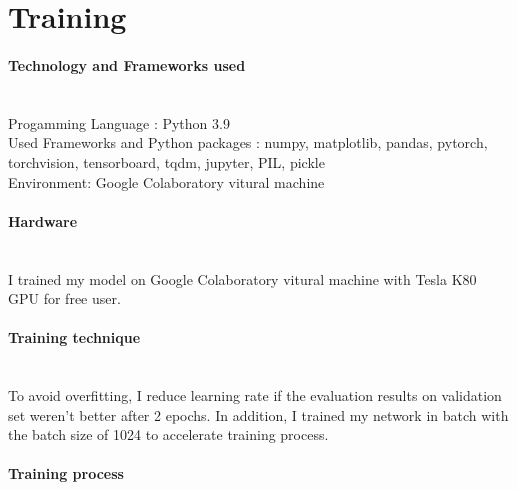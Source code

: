 \documentclass[runningheads]{llncs}
\begin{document}
\section{Training}
\paragraph{\large\bf Technology and Frameworks used}\hspace*{\fill} \\
Progamming Language : Python 3.9\\
Used Frameworks and Python packages : numpy, matplotlib, pandas, pytorch, torchvision, tensorboard, tqdm, jupyter, PIL, pickle\\
Environment: Google Colaboratory vitural machine
\paragraph{\large\bf Hardware}\hspace*{\fill} \\
I trained my model on Google Colaboratory vitural machine with Tesla K80 GPU for free user. 
\paragraph{\large\bf Training technique}\hspace*{\fill} \\
To avoid overfitting, I reduce learning rate if the evaluation results on validation set weren't better after 2 epochs. In addition, I trained my network in batch with the batch size of 1024 to accelerate training process.
\paragraph{\large\bf Training process}\hspace*{\fill} 
\end{document}
